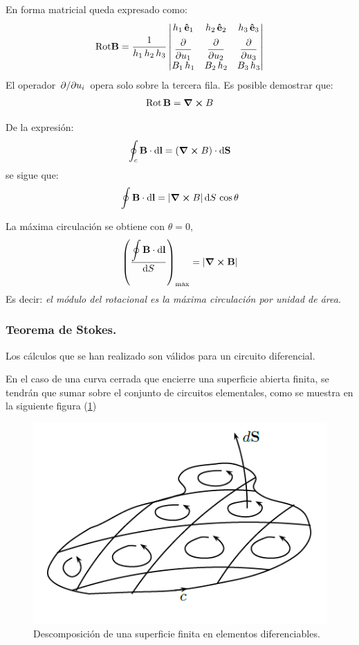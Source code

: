 \documentclass[12pt]{article}
\numberwithin{equation}{section}
\begin{document}
En forma matricial queda expresado como:
\begin{align*}
{\rm Rot} \vb{B} = \dfrac{1}{h_{1} \, h_{2} \, h_{3}} \mdet{
h_{1} \, \vu{e}_{1} & h_{2} \, \vu{e}_{2} & h_{3} \, \vu{e}_{3} \\[0.5em]
\displaystyle \pdv{u_{1}} & \displaystyle \pdv{u_{2}} & \displaystyle \pdv{u_{3}} \\[0.5em]
B_{1} \, h_{1} & B_{2} \, h_{2} & B_{3} \, h_{3}
}
\end{align*}
El operador $\pdv*{u_{i}}$ opera solo sobre la tercera fila. Es posible demostrar que:
\begin{align*}
{\rm Rot} \, \vb{B} = \curl{B}
\end{align*}

De la expresión:
\begin{align*}
\oint_{c} \vb{B} \cdot \dd{\vb{l}} = (\curl{B}) \cdot \dd{\vb{S}}
\end{align*}
se sigue que:
\begin{align*}
\oint \vb{B} \cdot \dd{\vb{l}} = \abs{\curl{B}} \dd{S \, \cos \theta}
\end{align*}

La máxima circulación se obtiene con $\theta = 0$,
\begin{align*}
\left( \dfrac{\displaystyle \oint \vb{B} \cdot \dd{\vb{l}}}{\dd{S}} \right)_{\max} = \abs{\curl{\vb{B}}}
\end{align*}
Es decir: \emph{el módulo del rotacional es la máxima circulación por unidad de área}.

\subsubsection{Teorema de Stokes.}

Los cálculos que se han realizado son válidos para un circuito diferencial.
\par
En el caso de una curva cerrada que encierre una superficie abierta finita, se tendrán que sumar sobre el conjunto de circuitos elementales, como se muestra en la siguiente figura (\ref{fig:figura_superficie_elementos_diferenciables})

\begin{figure}[H]
    \centering
    \includegraphics[scale=0.75]{Imagenes/Superficie_Elementos_Diferenciables.png}
    \caption{Descomposición de una superficie finita en elementos diferenciables.}
    \label{fig:figura_superficie_elementos_diferenciables}
\end{figure}
\end{document}
